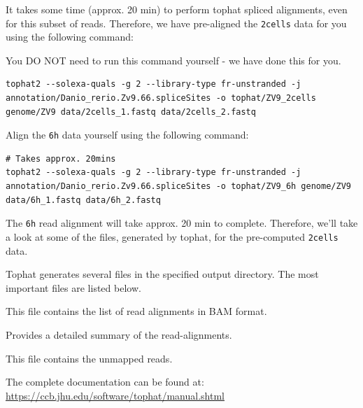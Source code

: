 It takes some time (approx. 20 min) to perform tophat spliced alignments, even for this subset of
reads. Therefore, we have pre-aligned the \texttt{2cells} data for you using the following command:
\begin{warning}
You DO NOT need to run this command yourself - we have done this for you.

\begin{lstlisting}
tophat2 --solexa-quals -g 2 --library-type fr-unstranded -j annotation/Danio_rerio.Zv9.66.spliceSites -o tophat/ZV9_2cells genome/ZV9 data/2cells_1.fastq data/2cells_2.fastq
\end{lstlisting}
\end{warning}

\begin{steps}
Align the \texttt{6h} data yourself using the following command:  

\begin{lstlisting}
# Takes approx. 20mins
tophat2 --solexa-quals -g 2 --library-type fr-unstranded -j annotation/Danio_rerio.Zv9.66.spliceSites -o tophat/ZV9_6h genome/ZV9 data/6h_1.fastq data/6h_2.fastq
\end{lstlisting}

\end{steps}

The \texttt{6h} read alignment will take approx. 20 min to complete. Therefore,
we'll take a look at some of the files, generated by tophat, for the
pre-computed \texttt{2cells} data.


\begin{information}
Tophat generates several files in the specified output directory. The most important files are listed below.
\begin{description}[style=multiline,labelindent=0cm,align=right,leftmargin=\descriptionlabelspace,rightmargin=1.5cm,font=\ttfamily]
\item[accepted\_hits.bam] This file contains the list of read alignments in BAM format.
\item[align\_summary.txt] Provides a detailed summary of the read-alignments. 
\item[unmapped.bam] This file contains the unmapped reads.
\end{description}

The complete documentation can be found at:
\url{https://ccb.jhu.edu/software/tophat/manual.shtml}
\end{information}




